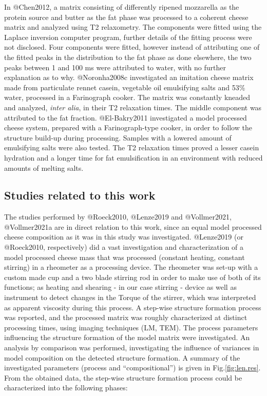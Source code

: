\documentclass[
]{article}
\begin{document}
In @Chen2012, a matrix consisting of differently ripened mozzarella as
the protein source and butter as the fat phase was processed to a
coherent cheese matrix and analyzed using T2 relaxometry. The components
were fitted using the Laplace inversion computer program, further
details of the fitting process were not disclosed. Four components were
fitted, however instead of attributing one of the fitted peaks in the
distribution to the fat phase as done elsewhere, the two peaks between 1
and 100 ms were attributed to water, with no further explanation as to
why. @Noronha2008c investigated an imitation cheese matrix made from
particulate rennet casein, vegetable oil emulsifying salts and 53\%
water, processed in a Farinograph cooker. The matrix was constantly
kneaded and analyzed, \emph{inter alia}, in their T2 relaxation times.
The middle component was attributed to the fat fraction. @El-Bakry2011
investigated a model processed cheese system, prepared with a
Farinograph-type cooker, in order to follow the structure build-up
during processing. Samples with a lowered amount of emulsifying salts
were also tested. The T2 relaxation times proved a lesser casein
hydration and a longer time for fat emulsification in an environment
with reduced amounts of melting salts.

\subsection{Studies related to this work}

The studies performed by @Roeck2010, @Lenze2019 and @Vollmer2021,
@Vollmer2021a are in direct relation to this work, since an equal model
processed cheese composition as it was in this study was investigated.
@Lenze2019 (or @Roeck2010, respectively) did a vast investigation and
characterization of a model processed cheese mass that was processed
(constant heating, constant stirring) in a rheometer as a processing
device. The rheometer was set-up with a custom made cup and a two blade
stirring rod in order to make use of both of its functions; as heating
and shearing - in our case stirring - device as well as instrument to
detect changes in the Torque of the stirrer, which was interpreted as
apparent viscosity during this process. A step-wise structure formation
process was reported, and the processed matrix was roughly characterized
at distinct processing times, using imaging techniques (LM, TEM). The
process parameters influencing the structure formation of the model
matrix were investigated. An analysis by comparison was performed,
investigating the influence of variances in model composition on the
detected structure formation. A summary of the investigated parameters
(process and ``compositional'') is given in Fig.\ref{fig:len.res}. From
the obtained data, the step-wise structure formation process could be
characterized into the following phases:
\end{document}
